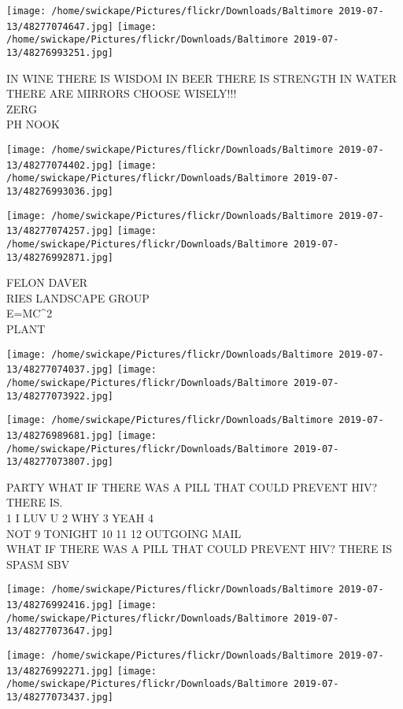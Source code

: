 \documentclass[10pt,letterpaper]{article}
\begin{document}
\vspace{0.25in}
\texttt{[image: /home/swickape/Pictures/flickr/Downloads/Baltimore 2019-07-13/48277074647.jpg]}
\texttt{[image: /home/swickape/Pictures/flickr/Downloads/Baltimore 2019-07-13/48276993251.jpg]}

IN WINE THERE IS WISDOM IN BEER THERE IS STRENGTH IN WATER THERE ARE MIRRORS CHOOSE WISELY!!!\\
ZERG\\
PH NOOK
\pagebreak

\texttt{[image: /home/swickape/Pictures/flickr/Downloads/Baltimore 2019-07-13/48277074402.jpg]}
\texttt{[image: /home/swickape/Pictures/flickr/Downloads/Baltimore 2019-07-13/48276993036.jpg]}

\texttt{[image: /home/swickape/Pictures/flickr/Downloads/Baltimore 2019-07-13/48277074257.jpg]}
\texttt{[image: /home/swickape/Pictures/flickr/Downloads/Baltimore 2019-07-13/48276992871.jpg]}

FELON DAVER\\
RIES LANDSCAPE GROUP\\
E=MC\^{}2\\
PLANT
\pagebreak

\texttt{[image: /home/swickape/Pictures/flickr/Downloads/Baltimore 2019-07-13/48277074037.jpg]}
\texttt{[image: /home/swickape/Pictures/flickr/Downloads/Baltimore 2019-07-13/48277073922.jpg]}

\texttt{[image: /home/swickape/Pictures/flickr/Downloads/Baltimore 2019-07-13/48276989681.jpg]}
\texttt{[image: /home/swickape/Pictures/flickr/Downloads/Baltimore 2019-07-13/48277073807.jpg]}

PARTY WHAT IF THERE WAS A PILL THAT COULD PREVENT HIV?  THERE IS.\\
1 I LUV U 2 WHY 3 YEAH 4\\
NOT 9 TONIGHT 10 11 12 OUTGOING MAIL\\
WHAT IF THERE WAS A PILL THAT COULD PREVENT HIV?  THERE IS SPASM SBV
\pagebreak

\texttt{[image: /home/swickape/Pictures/flickr/Downloads/Baltimore 2019-07-13/48276992416.jpg]}
\texttt{[image: /home/swickape/Pictures/flickr/Downloads/Baltimore 2019-07-13/48277073647.jpg]}

\texttt{[image: /home/swickape/Pictures/flickr/Downloads/Baltimore 2019-07-13/48276992271.jpg]}
\texttt{[image: /home/swickape/Pictures/flickr/Downloads/Baltimore 2019-07-13/48277073437.jpg]}
\end{document}
